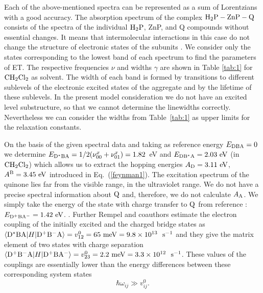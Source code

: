 \documentclass[12pt,twoside,a4paper]{report}
\begin{document}
Each of the above-mentioned spectra can be represented as a sum of
Lorentzians with a good accuracy. 
The absorption spectrum of the complex ${\rm H_2P-ZnP-Q}$
consists of the spectra
of the individual 
${\rm H_2P}$, ZnP, and Q compounds
without essential changes.
It means that intermolecular interactions in this case 
do not change the structure of electronic states of the subunits
\cite{r16}. 
We consider only the states corresponding to the lowest
band of each spectrum to find the parameters of ET.  
The respective frequencies $\nu$ and widths $\gamma$ are
shown in Table \ref{tab:1} for ${\rm CH_2Cl_2}$ as  solvent.  
The  width of each band is formed by 
transitions to different sublevels of 
the electronic excited states of the aggregate and 
by the lifetime of these sublevels. 
In the present model consideration we do not have an excited
level substructure, 
so that we cannot determine
the linewidths correctly. 
Nevertheless we can consider the
widths from Table~\ref{tab:1} 
as  upper limits for
the relaxation constants.


On the basis of the given spectral data and taking as  reference energy
$E_{\rm DBA}=0$ we determine 
$E_{\rm D^*BA}=1/2(\nu_{00}^x+\nu_{01}^x)=1.82$~{\rm eV} 
and $E_{\rm DB^*A}=2.03~ {\rm eV}$ (in ${\rm CH_2Cl_2}$) 
which allows us to extract the hopping energies
$A_{\rm D}=3.11~ {\rm eV}$, $A^{\rm B}=3.45~ {\rm eV}$ 
introduced in Eq.~(\ref{feynman1}).  
The excitation spectrum of the quinone
lies far from the visible range, in the ultraviolet range.
We do not have a precise spectral information about ${\rm Q}$ and, therefore,
we do not calculate $A_{\rm A}$.
We simply take the energy of the state with charge transfer to  ${\rm Q}$  from
reference \cite{r4}:
$E_{\rm D^+BA^-}=1.42~ {\rm eV}$. 
\cite{footnote}.
Further Rempel and
coauthors \cite{r4} estimate the electron coupling of 
the initially excited and 
the charged bridge states as
$\langle 
   {\rm D^*BA} 
   |H| 
   {\rm D^+B^-A} 
 \rangle
                =   v^0_{12}
                =   65~{\rm meV}
                =   9.8\times{}10^{13}~  ~{\rm s}^{-1}$
and they give  the
matrix element of two states with charge separation 
$\langle 
      {\rm D^+B^-A} 
      |H| 
      {\rm D^+BA^-} 
 \rangle           
                   =   v^0_{23}
                   =   2.2~{\rm meV}
                   =   3.3\times{}10^{12}~  ~{\rm s}^{-1}$. 
These values of the couplings are essentially lower than 
the energy differences between these corresponding system states
\begin{equation}
\label{inequality_w>v}
\hbar 
\omega
 _{ij} 
        \gg 
             v^0_{ij}.
\end{equation}
\end{document}
